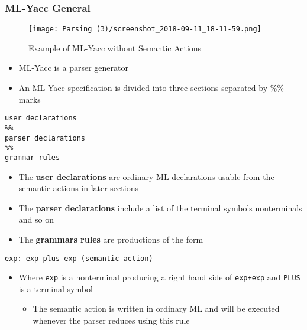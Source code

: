 \documentclass[11pt]{article}
\begin{document}
\subsubsection{ML-Yacc General}
\label{sec:orgcc8ac98}
\begin{figure}[htbp]
\centering
\texttt{[image: Parsing (3)/screenshot\_2018-09-11\_18-11-59.png]}
\caption{\label{fig:orgf46531f}
Example of ML-Yacc without Semantic Actions}
\end{figure}

\begin{itemize}
\item ML-Yacc is a parser generator
\item An ML-Yacc specification is divided into three sections separated by \%\% marks
\end{itemize}
\begin{verbatim}
user declarations
%%
parser declarations
%% 
grammar rules
\end{verbatim}

\begin{itemize}
\item The \textbf{user declarations} are ordinary ML declarations usable from the semantic actions in later sections
\item The \textbf{parser declarations} include a list of the terminal symbols nonterminals and so on
\item The \textbf{grammars rules} are productions of the form
\end{itemize}
\begin{verbatim}
exp: exp plus exp (semantic action)
\end{verbatim}
\begin{itemize}
\item Where \texttt{exp} is a nonterminal producing a right hand side of \texttt{exp+exp} and \texttt{PLUS} is a terminal symbol
\begin{itemize}
\item The semantic action is written in ordinary ML and will be executed whenever the parser reduces using this rule
\end{itemize}
\end{itemize}
\end{document}
